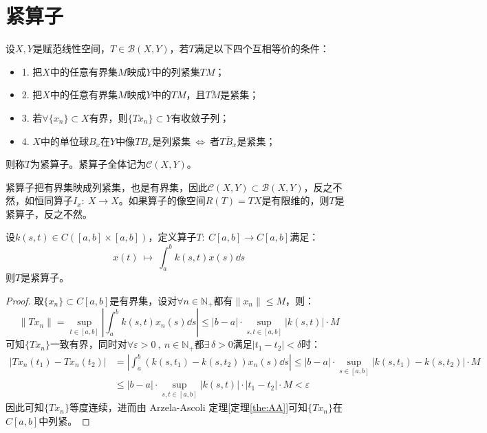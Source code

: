 \newpage
\section{紧算子}\label{jsz}
\begin{definition}[紧算子]\label{definition:jsz}
设$X,Y$是赋范线性空间，$T\in\mathscr{B}(X,Y)$，若$T$满足以下四个互相等价的条件：
\begin{itemize}
    \item 1. 把$X$中的任意有界集$M$映成$Y$中的列紧集$TM$；
    \item 2. 把$X$中的任意有界集$M$映成$Y$中的$TM$，且$\overline{TM}$是紧集；
    \item 3. 若$\forall \{x_n\} \subset X$有界，则$\{Tx_n\} \subset Y$有收敛子列；
    \item 4. $X$中的单位球$B_x$在$Y$中像$TB_x$是列紧集$ \ \Leftrightarrow \ $者$\overline{TB_x}$是紧集；
\end{itemize}
则称$T$为紧算子。紧算子全体记为$\mathscr{C}(X,Y)$。
\end{definition}
\begin{remark}
\quad 紧算子把有界集映成列紧集，也是有界集，因此$\mathscr{C}(X,Y) \subset \mathscr{B}(X,Y)$，反之不然，如恒同算子$I_x: \ X \to X$。如果算子的像空间$R(T)=TX$是有限维的，则$T$是紧算子，反之不然。
\end{remark}

\begin{example}
\quad 设$k(s,t) \in C([a,b]\times[a,b])$，定义算子$T: \ C[a,b] \to C[a,b]$满足：
\[x(t) \ \mapsto \ \int_a^bk(s,t)x(s)\dd{s}\]
则$T$是紧算子。
\end{example}
\begin{proof}
取$\{x_n\} \subset C[a,b]$是有界集，设对$\forall n \in \mathbb{N}_+$都有$\|x_n\| \leq M$，则：
\[\|Tx_n\|=\sup_{t \in [a,b]}\left|\int_a^bk(s,t)x_n(s)\dd{s}\right| \leq |b-a|\cdot\sup_{s,t \in [a,b]}|k(s,t)|\cdot M\]
可知$\{Tx_n\}$一致有界，同时对$\forall \varepsilon>0 \ , \ n \in \mathbb{N}_+$都$\exists \, \delta>0$满足$|t_1-t_2|<\delta$时：
\[\begin{aligned}
|Tx_n(t_1)-Tx_n(t_2)|&=\left|\int_a^b(k(s,t_1)-k(s,t_2))x_n(s)\dd{s}\right| \leq |b-a|\cdot\sup_{s \in [a,b]}|k(s,t_1)-k(s,t_2)|\cdot M\\
&\leq |b-a|\cdot\sup_{s,t \in [a,b]}|k(s,t)|\cdot|t_1-t_2|\cdot M<\varepsilon
\end{aligned}\]
因此可知$\{Tx_n\}$等度连续，进而由 Arzela-Ascoli 定理[定理\ref{the:AA}]可知$\{Tx_n\}$在$C[a,b]$中列紧。
\end{proof}

